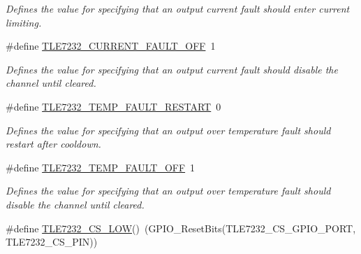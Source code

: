 \begin{DoxyCompactItemize}
\begin{DoxyCompactList}\small\item\em Defines the value for specifying that an output current fault should enter current limiting. \end{DoxyCompactList}\item 
\hypertarget{group__tle7232__driver_gae3d427736a0d9839593d5cceaaec90ec}{\#define \hyperlink{group__tle7232__driver_gae3d427736a0d9839593d5cceaaec90ec}{T\-L\-E7232\-\_\-\-C\-U\-R\-R\-E\-N\-T\-\_\-\-F\-A\-U\-L\-T\-\_\-\-O\-F\-F}~1}\label{group__tle7232__driver_gae3d427736a0d9839593d5cceaaec90ec}

\begin{DoxyCompactList}\small\item\em Defines the value for specifying that an output current fault should disable the channel until cleared. \end{DoxyCompactList}\item 
\hypertarget{group__tle7232__driver_ga8f8a4167b9dca7249c7a09b1370ecd33}{\#define \hyperlink{group__tle7232__driver_ga8f8a4167b9dca7249c7a09b1370ecd33}{T\-L\-E7232\-\_\-\-T\-E\-M\-P\-\_\-\-F\-A\-U\-L\-T\-\_\-\-R\-E\-S\-T\-A\-R\-T}~0}\label{group__tle7232__driver_ga8f8a4167b9dca7249c7a09b1370ecd33}

\begin{DoxyCompactList}\small\item\em Defines the value for specifying that an output over temperature fault should restart after cooldown. \end{DoxyCompactList}\item 
\hypertarget{group__tle7232__driver_ga5d58ff304d7b6adf09ca14e9cd0771c0}{\#define \hyperlink{group__tle7232__driver_ga5d58ff304d7b6adf09ca14e9cd0771c0}{T\-L\-E7232\-\_\-\-T\-E\-M\-P\-\_\-\-F\-A\-U\-L\-T\-\_\-\-O\-F\-F}~1}\label{group__tle7232__driver_ga5d58ff304d7b6adf09ca14e9cd0771c0}

\begin{DoxyCompactList}\small\item\em Defines the value for specifying that an output over temperature fault should disable the channel until cleared. \end{DoxyCompactList}\item 
\hypertarget{group__tle7232__driver_gaf3e778e49469b6ce4fc05cb8092b1e78}{\#define \hyperlink{group__tle7232__driver_gaf3e778e49469b6ce4fc05cb8092b1e78}{T\-L\-E7232\-\_\-\-C\-S\-\_\-\-L\-O\-W}()~(G\-P\-I\-O\-\_\-\-Reset\-Bits(T\-L\-E7232\-\_\-\-C\-S\-\_\-\-G\-P\-I\-O\-\_\-\-P\-O\-R\-T, T\-L\-E7232\-\_\-\-C\-S\-\_\-\-P\-I\-N))}\label{group__tle7232__driver_gaf3e778e49469b6ce4fc05cb8092b1e78}


\end{DoxyCompactItemize}
